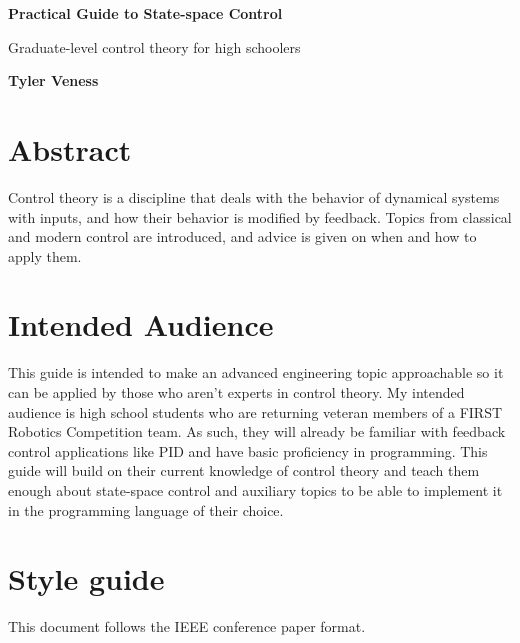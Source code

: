 \documentclass[10pt,conference,compsoc]{IEEEtran}
\begin{document}


\begin{titlepage}
  \begin{center}
    \vspace*{1cm}

    \Huge
    \textbf{Practical Guide to State-space Control}

    \vspace{0.5cm}
    \LARGE
    Graduate-level control theory for high schoolers

    \vspace{1.5cm}

    \textbf{Tyler Veness}

    \vfill

    \vspace{0.8cm}

  \end{center}

  \vfill

  \section{Abstract}

  \noindent Control theory is a discipline that deals with the behavior of
  dynamical \glspl{system} with inputs, and how their behavior is modified by
  feedback. Topics from classical and modern control are introduced, and advice
  is given on when and how to apply them.

  \section{Intended Audience}

  \noindent This guide is intended to make an advanced engineering topic
  approachable so it can be applied by those who aren't experts in control
  theory. My intended audience is high school students who are returning veteran
  members of a FIRST Robotics Competition team. As such, they will already be
  familiar with feedback control applications like PID and have basic
  proficiency in programming. This guide will build on their current knowledge
  of control theory and teach them enough about state-space control and
  auxiliary topics to be able to implement it in the programming language of
  their choice.

  \section{Style guide}

  \noindent This document follows the IEEE conference paper format.

  \vspace{0.8cm}
\end{titlepage}
\thispagestyle{empty}  %
\end{document}
